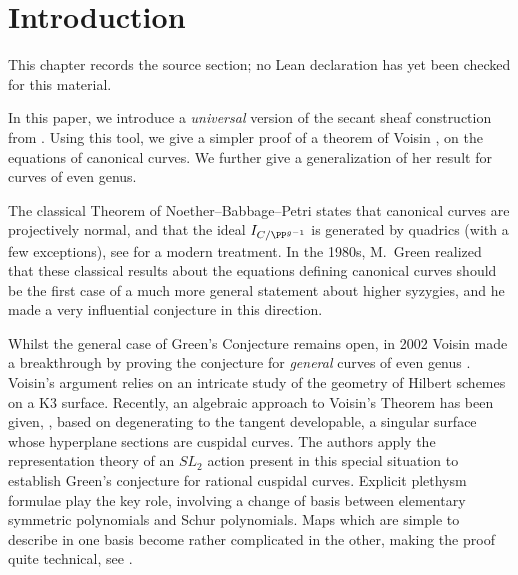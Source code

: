 \chapter{Introduction}
\label{universal-secant-bundles-syzygies-canonical-curves-chapter-01}

\begin{remark}
\label{universal-secant-bundles-syzygies-canonical-curves-chapter-01-source}
This chapter records the source section; no Lean declaration has yet been checked for this material.
\notready
\end{remark}

In this paper, we introduce a \emph{universal} version of the secant sheaf construction from \cite{ein-lazarsfeld-asymptotic}. Using this tool, we give a simpler proof of a theorem of Voisin \cite{V1}, \cite{V2} on the equations of canonical curves. We further give a generalization of her result for curves of even genus.

 The classical Theorem of Noether--Babbage--Petri states that canonical curves are projectively normal, and that the ideal $I_{C/\PP^{g-1}}$ is generated by quadrics (with a few exceptions), see \cite{arbarello-sernesi-petri} for a modern treatment. In the 1980s, M.\ Green realized that these classical results about the equations defining canonical curves should be the first case of a much more general statement about higher syzygies, and he made a very influential conjecture \cite{green-koszul} in this direction.

Whilst the general case of Green's Conjecture remains open, in 2002 Voisin made a breakthrough by proving the conjecture for \emph{general} curves of even genus \cite{V1}.  Voisin's argument relies on an intricate study of the geometry of Hilbert schemes on a K3 surface. Recently, an algebraic approach to Voisin's Theorem has been given, \cite{AFPRW}, based on degenerating to the tangent developable, a singular surface whose hyperplane sections are cuspidal curves. The authors apply the representation theory of an $SL_2$ action present in this special situation to establish Green's conjecture for rational cuspidal curves. Explicit plethysm formulae play the key role, involving a change of basis between elementary symmetric polynomials and Schur polynomials. Maps which are simple to describe in one basis become rather complicated in the other, making the proof quite technical, see \cite[\S 5.5--5.7]{AFPRW}.


